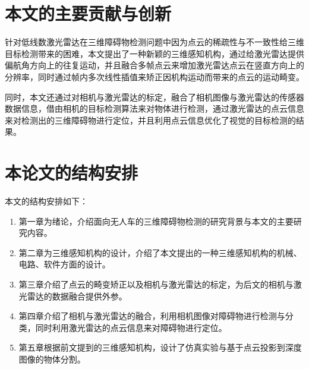 \section{本文的主要贡献与创新}
针对低线数激光雷达在三维障碍物检测问题中因为点云的稀疏性与不一致性给三维目标检测带来的困难，本文提出了一种新颖的三维感知机构，通过给激光雷达提供偏航角方向上的往复运动，并且融合多帧点云来增加激光雷达点云在竖直方向上的分辨率，同时通过帧内多次线性插值来矫正因机构运动而带来的点云的运动畸变。

同时，本文还通过对相机与激光雷达的标定，融合了相机图像与激光雷达的传感器数据信息，借由相机的目标检测算法来对物体进行检测，通过激光雷达的点云信息来对检测出的三维障碍物进行定位，并且利用点云信息优化了视觉的目标检测的结果。

\section{本论文的结构安排}
本文的结构安排如下：
\begin{enumerate}
    \item 第一章为绪论，介绍面向无人车的三维障碍物检测的研究背景与本文的主要研究内容。
    \item 第二章为三维感知机构的设计，介绍了本文提出的一种三维感知机构的机械、电路、软件方面的设计。
    \item 第三章介绍了点云的畸变矫正以及相机与激光雷达的标定，为后文的相机与激光雷达的数据融合提供外参。
    \item 第四章介绍了相机与激光雷达的融合，利用相机图像对障碍物进行检测与分类，同时利用激光雷达的点云信息来对障碍物进行定位。
    \item 第五章根据前文提到的三维感知机构，设计了仿真实验与基于点云投影到深度图像的物体分割。
\end{enumerate}